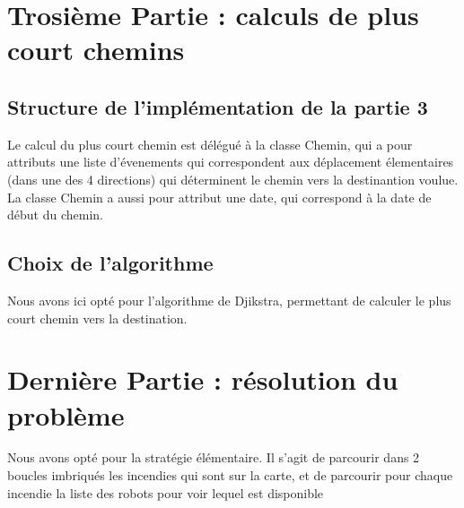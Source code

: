 \documentclass{article}
\begin{document}
\section{Trosième Partie : calculs de plus court chemins}

\subsection{Structure de l'implémentation de la partie 3}

Le calcul du plus court chemin est délégué à la classe Chemin, qui a pour attributs une liste d'évenements qui correspondent aux déplacement élementaires (dans une des 4 directions) qui déterminent le chemin vers la destinantion voulue. La classe Chemin a aussi pour attribut une date, qui correspond à la date de début du chemin.

\subsection{Choix de l'algorithme}

Nous avons ici opté pour l'algorithme de Djikstra, permettant de calculer le plus court chemin vers la destination. 

\section{Dernière Partie : résolution du problème}

Nous avons opté pour la stratégie élémentaire. Il s'agit de parcourir dans 2 boucles imbriqués les incendies qui sont sur la carte, et de parcourir pour chaque incendie la liste des robots pour voir lequel est disponible
\end{document}
